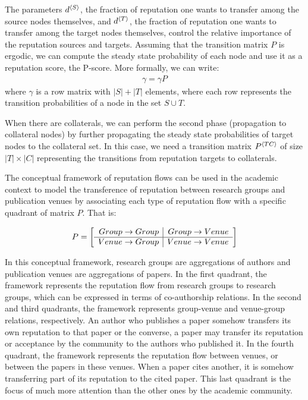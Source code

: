 \documentclass[notitlepage]{svjour3}
\begin{document}
The parameters $d{^{\langle S \rangle}}$, the fraction of reputation one wants to transfer among the source nodes themselves, 
and $d{^{\langle T \rangle}}$, the fraction of reputation one wants to transfer among the target nodes themselves,
control the relative importance of the reputation sources and targets. 
Assuming that the transition matrix $P$ is ergodic, we can compute the steady state probability of each node 
and use it as a reputation score, the P-score. 
More formally, we can write: 
\begin{align}
\label{eq:ggP}
\gamma = \gamma P
\end{align}
\noindent where $\gamma$ is a row matrix with $|S|+|T|$ elements, 
where each row represents the transition probabilities of a node in the set $S\cup T$. 

When there are collaterals, we can perform the second phase (propagation to collateral nodes) 
by further propagating the steady state probabilities of target nodes to the collateral set. 
In this case, we need a transition matrix $P{^{\langle TC \rangle}}$ of size $|T|\times |C|$ representing
the transitions from reputation targets to collaterals.

The conceptual framework of reputation flows can be used in the academic context
to model the transference of reputation between research groups and 
publication venues by associating each type of reputation flow with a specific quadrant
of matrix $P$. That is:

\begin{align}\label{eq:newp}
P =
\left[
\begin{array}{r | r}
Group \rightarrow Group & Group \rightarrow Venue \\
\hline
Venue \rightarrow Group & Venue \rightarrow Venue \\
\end{array}
\right]
\end{align}

In this conceptual framework, research groups are 
aggregations of authors and publication venues are aggregations of papers.
In the first quadrant, the framework represents the reputation
flow from research groups to research groups, which can be expressed in
terms of co-authorship relations. In the second and 
third quadrants, the framework
represents group-venue and venue-group relations,
respectively. An author who publishes a paper somehow
transfers its own reputation to that paper or the converse,
a paper may transfer its reputation or acceptance by the
community to the authors who published it. In the fourth
quadrant, the framework represents the reputation flow between
venues, or between the papers in these venues. When a paper cites 
another, it is somehow
transferring part of its reputation to the cited paper. This
last quadrant is the focus of much more attention than the
other ones by the academic community. 
\end{document}
